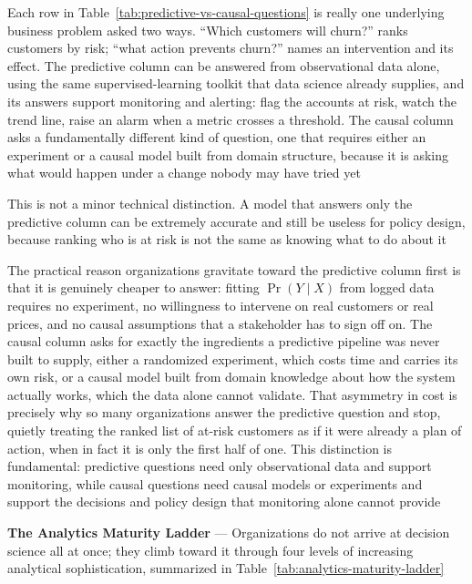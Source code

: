Each row in Table~\ref{tab:predictive-vs-causal-questions} is really one
underlying business problem asked two ways. ``Which customers will churn?''
ranks customers by risk; ``what action prevents churn?'' names an intervention
and its effect. The predictive column can be answered from observational data alone,
using the same supervised-learning toolkit that data science already supplies, and
its answers support monitoring and alerting: flag the accounts at risk, watch the
trend line, raise an alarm when a metric crosses a threshold. The causal column asks
a fundamentally different kind of question, one that requires either an
experiment or a causal model built from domain structure, because it is asking what
would happen under a change nobody may have tried yet

This is not a minor technical distinction. A model that answers only the predictive
column can be extremely accurate and still be useless for policy design, because
ranking who is at risk is not the same as knowing what to do about it

The practical reason organizations gravitate toward the predictive column first is
that it is genuinely cheaper to answer: fitting $\Pr(Y \mid X)$ from logged data
requires no experiment, no willingness to intervene on real customers or real prices,
and no causal assumptions that a stakeholder has to sign off on. The causal column
asks for exactly the ingredients a predictive pipeline was never built to supply,
either a randomized experiment, which costs time and carries its own risk, or a
causal model built from domain knowledge about how the system actually works, which
the data alone cannot validate. That asymmetry in cost is precisely why so many
organizations answer the predictive question and stop, quietly treating the ranked
list of at-risk customers as if it were already a plan of action, when in fact
it is only the first half of one. This distinction is fundamental: predictive
questions need only observational data and support monitoring, while causal questions
need causal models or experiments and support the decisions and policy design that
monitoring alone cannot provide

\textbf{The Analytics Maturity Ladder} --- Organizations do not arrive at decision
science all at once; they climb toward it through four levels of increasing
analytical sophistication, summarized in Table~\ref{tab:analytics-maturity-ladder}

